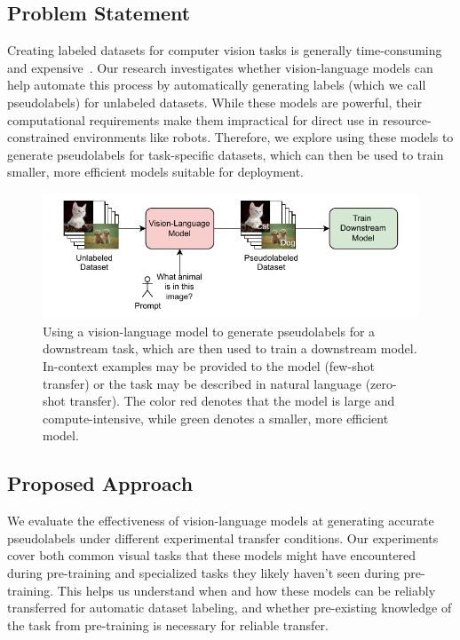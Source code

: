 \documentclass[../ShajiS_RnDReport.tex]{subfiles}
\begin{document}
\subsection{Problem Statement}
\label{sec:introduction:problem_statement}

Creating labeled datasets for computer vision tasks is generally time-consuming and expensive~\cite{Deng2009}. Our research investigates whether vision-language models can help automate this process by automatically generating labels (which we call pseudolabels) for unlabeled datasets. While these models are powerful, their computational requirements make them impractical for direct use in resource-constrained environments like robots. Therefore, we explore using these models to generate pseudolabels for task-specific datasets, which can then be used to train smaller, more efficient models suitable for deployment.

\begin{figure}[ht]
    \centering
    \includegraphics[width=\linewidth]{figures/vlm_transfer_downstream.pdf}
    \caption{Using a vision-language model to generate pseudolabels for a downstream task, which are then used to train a downstream model. In-context examples may be provided to the model (few-shot transfer) or the task may be described in natural language (zero-shot transfer). The color red denotes that the model is large and compute-intensive, while green denotes a smaller, more efficient model.}
    \label{fig:vlm-transfer-downstream}
\end{figure}

\subsection{Proposed Approach}
\label{sec:introduction:proposed_approach}

We evaluate the effectiveness of vision-language models at generating accurate pseudolabels under different experimental transfer conditions. Our experiments cover both common visual tasks that these models might have encountered during pre-training and specialized tasks they likely haven't seen during pre-training. This helps us understand when and how these models can be reliably transferred for automatic dataset labeling, and whether pre-existing knowledge of the task from pre-training is necessary for reliable transfer.
\end{document}
